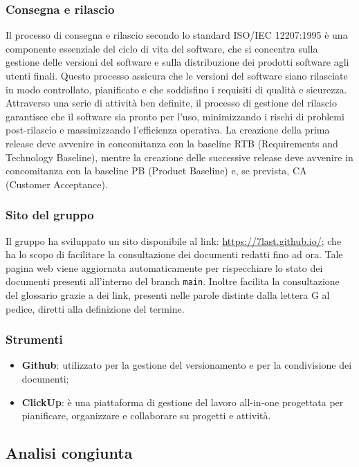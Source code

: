 \subsubsection{Consegna e rilascio}
Il processo di consegna e rilascio secondo lo standard ISO/IEC 12207:1995 è una componente essenziale del ciclo di vita del software, che si concentra sulla gestione delle versioni del software e sulla distribuzione dei prodotti software agli utenti finali. Questo processo assicura che le versioni del software siano rilasciate in modo controllato, pianificato e che soddisfino i requisiti di qualità e sicurezza. Attraverso una serie di attività ben definite, il processo di gestione del rilascio garantisce che il software sia pronto per l'uso, minimizzando i rischi di problemi post-rilascio e massimizzando l'efficienza operativa. La creazione della prima release deve avvenire in concomitanza con la baseline RTB (Requirements and Technology Baseline), mentre la creazione delle successive release deve avvenire in concomitanza con la baseline PB (Product Baseline) e, se prevista, CA (Customer Acceptance).

\subsubsection{Sito del gruppo}
Il gruppo ha sviluppato un sito disponibile al link: \url{https://7last.github.io/}; che ha lo scopo di facilitare la consultazione dei documenti redatti fino ad ora. Tale pagina web viene aggiornata automaticamente per rispecchiare lo stato dei documenti presenti all'interno del branch \texttt{main}. Inoltre facilita la consultazione del glossario grazie a dei link, presenti nelle parole distinte dalla lettera G al pedice, diretti alla definizione del termine.

\subsubsection{Strumenti} %

\begin{itemize}
	\item \textbf{Github}: utilizzato per la gestione del versionamento e per la condivisione dei documenti;
	\item \textbf{ClickUp}: è una piattaforma di gestione del lavoro all-in-one progettata per pianificare, organizzare e collaborare su progetti e attività.
\end{itemize}


\subsection{Analisi congiunta}
